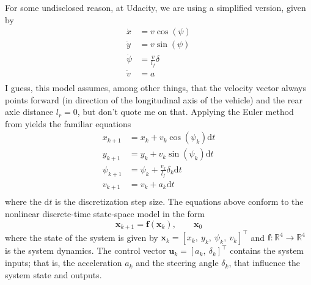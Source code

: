 \documentclass[a4paper]{article}
\begin{document}
For some undisclosed reason, at Udacity, we are using a simplified version, given by
\begin{subequations}
\begin{align}\label{eq:kinematic_bicycle_model_continuous_udacity}
\dot{x} 	&=  v \cos(\psi) \\
\dot{y} 	&=  v \sin(\psi) \\
\dot{\psi} 	&=  \frac{v}{l_f} \delta \\
\dot{v} 	&=  a \\
\end{align}
\end{subequations}
I guess, this model assumes, among other things, that the velocity vector always points forward (in direction of the longitudinal axis of the vehicle) and the rear axle distance \( l_r = 0 \), but don't quote me on that.
Applying the Euler method from  yields the familiar equations
\begin{subequations}
\begin{align}\label{eq:kinematic_bicycle_model_discrete_udacity}
x_{k+1} 	&= x_k + v_k\cos(\psi_k) \mathrm{d}t \\
y_{k+1} 	&= y_k + v_k\sin(\psi_k) \mathrm{d}t \\
\psi_{k+1} 	&= \psi_k + \frac{v_k}{l_f}\delta_k \mathrm{d}t \\
v_{k+1} 	&= v_k + a_k\mathrm{d}t \\
\end{align}
\end{subequations}
where the \( \mathrm{d}t \) is the discretization step size.
The equations above conform to the nonlinear discrete-time state-space model in the form
\begin{equation}\label{eq:mpc_general_ssm}
	\bm{x}_{k+1} = \bm{f}(\bm{x}_k),\qquad \bm{x}_0
\end{equation}
where the state of the system is given by \( \bm{x}_k = \left[x_k,\ y_k,\ \psi_k,\ v_k \right]^\top \) and \( \bm{f}: \mathbb{R}^4\to\mathbb{R}^4 \) is the system dynamics.
The control vector \( \bm{u}_k = \left[a_k,\ \delta_k\right]^\top \) contains the system inputs; that is, the acceleration \( a_k \) and the steering angle \( \delta_k \), that influence the system state and outputs.
\end{document}
